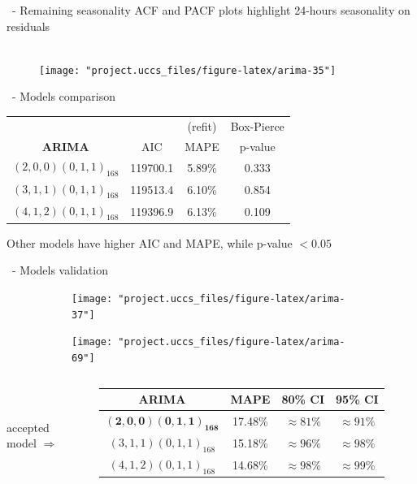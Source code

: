 \documentclass{beamer}
\begin{document}
\begin{frame}{\subsecname~- Remaining seasonality}
	\centering
	ACF and PACF plots highlight 24-hours seasonality on residuals\\~
	\begin{figure}[h]
		\centering
		\texttt{[image: "project.uccs\_files/figure-latex/arima-35"]}
	\end{figure}
\end{frame}

\begin{frame}{\subsecname~- Models comparison}
	\begin{table}
		\begin{tabular}{c | c c c}
			               &     & (refit) & Box-Pierce \\
			\textbf{ARIMA} & AIC & MAPE    & p-value \\
			\midrule
			$(2,0,0)(0,1,1)_{168}$ & 119700.1 & 5.89\% & 0.333 \\
			$(3,1,1)(0,1,1)_{168}$ & 119513.4 & 6.10\% & 0.854 \\
			$(4,1,2)(0,1,1)_{168}$ & 119396.9 & 6.13\% & 0.109\\
		\end{tabular}
	\end{table}
	\vspace{0.1\textheight}\centering
	Other models have higher AIC and MAPE, while p-value $< 0.05$
\end{frame}

\begin{frame}{\subsecname~- Models validation}
	\begin{figure}
		\begin{subfigure}{.49\linewidth}
			\texttt{[image: "project.uccs\_files/figure-latex/arima-37"]}
		\end{subfigure}
		\begin{subfigure}{.49\linewidth}
			\texttt{[image: "project.uccs\_files/figure-latex/arima-69"]}
		\end{subfigure}
	\end{figure}
	\begin{columns}[T]
		\raggedleft~\\~\\\vspace{1em}accepted model $\Rightarrow$\hspace{-1.3em}
		\begin{table}
			\begin{tabular}{c | c c c}
				\textbf{ARIMA} & MAPE   & 80\% CI & 95\% CI \\
				\midrule
				$\mathbf{(2,0,0)(0,1,1)_{168}}$ & 17.48\% & $\approx81\%$ & $\approx91\%$ \\
				$(3,1,1)(0,1,1)_{168}$ & 15.18\% & $\approx96\%$ & $\approx98\%$ \\
				$(4,1,2)(0,1,1)_{168}$ & 14.68\% & $\approx98\%$ & $\approx99\%$ \\
			\end{tabular}
		\end{table}
	\end{columns}
\end{frame}
\end{document}
